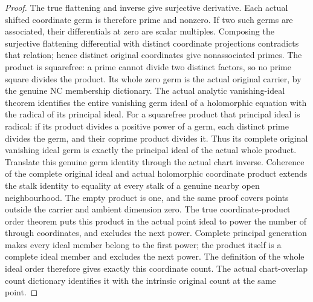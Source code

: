 \begin{proof}
The true flattening and inverse give surjective derivative. Each actual shifted
coordinate germ is therefore prime and nonzero. If two such germs are associated,
their differentials at zero are scalar multiples. Composing the surjective
flattening differential with distinct coordinate projections contradicts that
relation; hence distinct original coordinates give nonassociated primes.
The product is squarefree: a prime cannot divide two distinct factors, so no
prime square divides the product. Its whole zero germ is the actual original
carrier, by the genuine NC membership dictionary. The actual analytic
vanishing-ideal theorem identifies the entire vanishing germ ideal of a
holomorphic equation with the radical of its principal ideal. For a squarefree
product that principal ideal is radical: if its product divides a positive
power of a germ, each distinct prime divides the germ, and their coprime product
divides it. Thus its complete original vanishing ideal germ is exactly the
principal ideal of the actual whole product. Translate this genuine germ
identity through the actual chart inverse. Coherence of the complete original
ideal and actual holomorphic coordinate product extends the stalk identity to
equality at every stalk of a genuine nearby open neighbourhood. The empty
product is one, and the same proof covers points outside the carrier and
ambient dimension zero.
The true coordinate-product order theorem puts this product in the actual
point ideal to power the number of through coordinates, and excludes the
next power. Complete principal generation makes every ideal member belong to
the first power; the product itself is a complete ideal member and excludes
the next power. The definition of the whole ideal order therefore gives
exactly this coordinate count. The actual chart-overlap count dictionary
identifies it with the intrinsic original count at the same point.
\end{proof}

